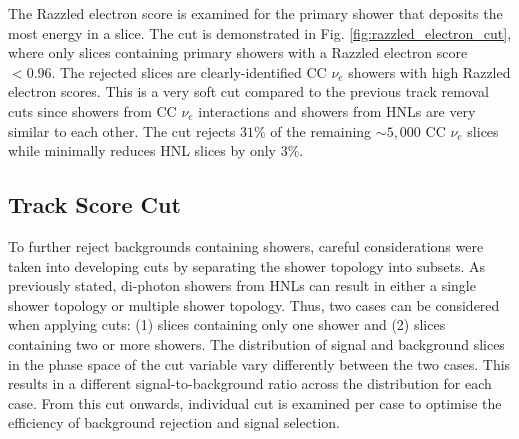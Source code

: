 The Razzled electron score is examined for the primary shower that deposits the most energy in a slice.
The cut is demonstrated in Fig. \ref{fig:razzled_electron_cut}, where only slices containing primary showers with a Razzled electron score $< 0.96$.
The rejected slices are clearly-identified CC $\nu_e$ showers with high Razzled electron scores.
This is a very soft cut compared to the previous track removal cuts since showers from CC $\nu_e$ interactions and showers from HNLs are very similar to each other.
The cut rejects $31\%$ of the remaining $\sim5,000$ CC $\nu_e$ slices while minimally reduces HNL slices by only $3 \%$.

\subsection{Track Score Cut}
\label{sec:trk_score}

To further reject backgrounds containing showers, careful considerations were taken into developing cuts by separating the shower topology into subsets.
As previously stated, di-photon showers from HNLs can result in either a single shower topology or multiple shower topology.
Thus, two cases can be considered when applying cuts: (1) slices containing only one shower and (2) slices containing two or more showers.
The distribution of signal and background slices in the phase space of the cut variable vary differently between the two cases.
This results in a different signal-to-background ratio across the distribution for each case.
From this cut onwards, individual cut is examined per case to optimise the efficiency of background rejection and signal selection. 

